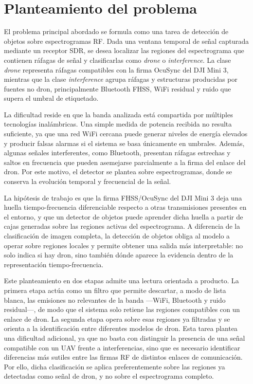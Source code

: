 \section{Planteamiento del problema}
\label{sec:planteamiento}

El problema principal abordado se formula como una tarea de detección de objetos sobre espectrogramas RF. Dada una ventana temporal de señal capturada mediante un receptor SDR, se desea localizar las regiones del espectrograma que contienen ráfagas de señal y clasificarlas como \emph{drone} o \emph{interference}. La clase \emph{drone} representa ráfagas compatibles con la firma OcuSync del DJI Mini 3, mientras que la clase \emph{interference} agrupa ráfagas y estructuras producidas por fuentes no dron, principalmente Bluetooth FHSS, WiFi residual y ruido que supera el umbral de etiquetado.

La dificultad reside en que la banda analizada está compartida por múltiples tecnologías inalámbricas. Una simple medida de potencia recibida no resulta suficiente, ya que una red WiFi cercana puede generar niveles de energía elevados y producir falsas alarmas si el sistema se basa únicamente en umbrales. Además, algunas señales interferentes, como Bluetooth, presentan ráfagas estrechas y saltos en frecuencia que pueden asemejarse parcialmente a la firma del enlace del dron. Por este motivo, el detector se plantea sobre espectrogramas, donde se conserva la evolución temporal y frecuencial de la señal.

La hipótesis de trabajo es que la firma FHSS/OcuSync del DJI Mini 3 deja una huella tiempo-frecuencia diferenciable respecto a otras transmisiones presentes en el entorno, y que un detector de objetos puede aprender dicha huella a partir de cajas generadas sobre las regiones activas del espectrograma. A diferencia de la clasificación de imagen completa, la detección de objetos obliga al modelo a operar sobre regiones locales y permite obtener una salida más interpretable: no solo indica si hay dron, sino también dónde aparece la evidencia dentro de la representación tiempo-frecuencia.

Este planteamiento en dos etapas admite una lectura orientada a producto. La primera etapa actúa como un filtro que permite descartar, a modo de lista blanca, las emisiones no relevantes de la banda —WiFi, Bluetooth y ruido residual—, de modo que el sistema solo retiene las regiones compatibles con un enlace de dron. La segunda etapa opera sobre esas regiones ya filtradas y se orienta a la identificación entre diferentes modelos de dron. Esta tarea plantea una dificultad adicional, ya que no basta con distinguir la presencia de una señal compatible con un UAV frente a interferencias, sino que es necesario identificar diferencias más sutiles entre las firmas RF de distintos enlaces de comunicación. Por ello, dicha clasificación se aplica preferentemente sobre las regiones ya detectadas como señal de dron, y no sobre el espectrograma completo.

